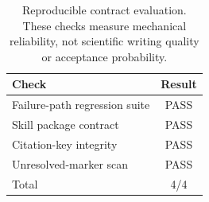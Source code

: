 \begin{table}[t]
\centering
\caption{Reproducible contract evaluation. These checks measure mechanical reliability, not scientific writing quality or acceptance probability.}
\label{tab:contract-evaluation}
\begin{tabular}{lc}
\toprule
Check & Result \\
\midrule
Failure-path regression suite & PASS \\
Skill package contract & PASS \\
Citation-key integrity & PASS \\
Unresolved-marker scan & PASS \\
\midrule
Total & 4/4 \\
\bottomrule
\end{tabular}
\end{table}
